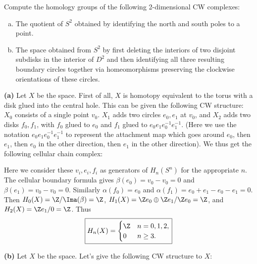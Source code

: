 \documentclass[11pt,letterpaper]{article}
\begin{document}
\begin{problem}
    Compute the homology groups of the following 2-dimensional CW complexes:
    \begin{enumerate}[(a)]
        \item The quotient of $S^2$ obtained by identifying the north and south poles to a point.
        \item The space obtained from $S^2$ by first deleting the interiors of two disjoint subdisks in the
        interior of $D^2$ and then identifying all three resulting boundary circles together via homeomorphisms preserving the clockwise orientations of these circles.
    \end{enumerate}
\end{problem}

\begin{solution}
    \textbf{(a)} Let $X$ be the space. First of all, $X$ is homotopy equivalent to the torus with a disk glued into the central hole. This can be given the following CW structure: $X_0$ consists of a single point $v_0$. $X_1$ adds two circles $e_0, e_1$ at $v_0$, and $X_2$ adds two disks $f_0, f_1$, with $f_0$ glued to $e_0$ and $f_1$ glued to $e_0e_1e_0^{-1}e_1^{-1}$. (Here we use the notation $e_0e_1e_0^{-1}e_1^{-1}$ to represent the attachment map which goes around $e_0$, then $e_1$, then $e_0$ in the other direction, then $e_1$ in the other direction). We thus get the following cellular chain complex:
    \begin{center}
    \end{center}
    \quad Here we consider these $v_i, e_i, f_i$ as generators of $H_n(S^n)$ for the appropriate $n$. The cellular boundary formula gives $\beta(e_0)=v_0-v_0=0$ and $\beta(e_1)=v_0-v_0=0$. Similarly $\alpha(f_0)=e_0$ and $\alpha(f_1)=e_0 + e_1 - e_0 - e_1 = 0$. Then $H_0(X)=\Z / \Ima(\beta) = \Z$, $H_1(X)=\Z e_0 \oplus \Z e_1 / \Z e_0 = \Z$, and $H_2(X)=\Z e_1 / 0 = \Z$. Thus
    \[
        \boxed{H_n(X)=\begin{cases}
            \Z& n=0,1,2,\\
            0& n\geq 3.
        \end{cases}}
    \]    

    \textbf{(b)} Let $X$ be the space. Let's give the following CW structure to $X$:


\end{solution}
\end{document}

